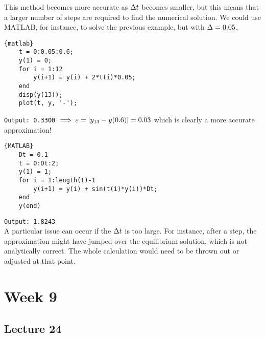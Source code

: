 \documentclass{report}
\begin{document}
This method becomes more accurate as $\Delta t$ becomes smaller, but this means that a larger number of steps are required to find the numerical solution. We could use MATLAB, for instance, to solve the previous example, but with $\Delta = 0.05$,

\begin{lstlisting}{matlab}
	t = 0:0.05:0.6;
	y(1) = 0;
	for i = 1:12
		y(i+1) = y(i) + 2*t(i)*0.05;
	end
	disp(y(13));
	plot(t, y, '-');
\end{lstlisting}
\verb|Output: 0.3300| $\implies \varepsilon = \left| y_{13} - y(0.6) \right| = 0.03$ which is clearly a more accurate approximation!


\begin{lstlisting}{MATLAB}
	Dt = 0.1
	t = 0:Dt:2;
	y(1) = 1;
	for i = 1:length(t)-1
		y(i+1) = y(i) + sin(t(i)*y(i))*Dt;
	end
	y(end)
\end{lstlisting}
\verb|Output: 1.8243| \\

A particular issue can occur if the $\Delta t$ is too large. For instance, after a step, the approximation might have jumped over the equilibrium solution, which is not analytically correct. The whole calculation would need to be thrown out or adjusted at that point.


\chapter{Week 9}
\section{Lecture 24}
\end{document}
